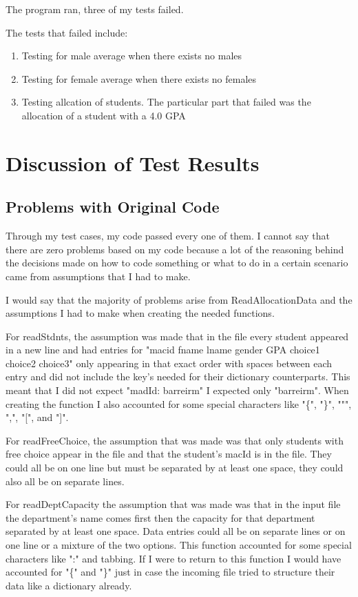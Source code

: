 \documentclass[12pt]{article}
\begin{document}
The program ran, three of my tests failed. 

The tests that failed include: 
\begin{enumerate}

\item Testing for male average when there exists no males
\item Testing for female average when there exists no females
\item Testing allcation of students. The particular part that failed was the allocation of a student with a 4.0 GPA 

\end{enumerate}

\section{Discussion of Test Results}

\subsection{Problems with Original Code}

Through my test cases, my code passed every one of them. I cannot say that there are zero problems based on my code because a lot of the 
reasoning behind the decisions made on how to code something or what to do in a certain scenario came from assumptions that I had to make.

I would say that the majority of problems arise from ReadAllocationData and the assumptions I had to make when creating the needed
functions. 

For readStdnts, the assumption was made that in the file every student appeared in a new line and had entries for "macid 
fname lname gender GPA choice1 choice2 choice3" only appearing in that exact order with spaces between each entry and did not include the
key's needed for their dictionary counterparts. This meant that I did not expect "madId: barreirm" I expected only "barreirm". When 
creating the function I also accounted for some special characters like "\{", "\}", """, ",", "[", and "]". 

For readFreeChoice, the assumption that was made was that only students with free choice appear in the file and that the student's macId is
in the file. They could all be on one line but must be separated by at least one space, they could also all be on separate lines. 

For readDeptCapacity the assumption that was made was that in the input file the department's name comes first then the capacity for that
department separated by at least one space. Data entries could all be on separate lines or on one line or a mixture of the two options. 
This function accounted for some special characters like ":" and tabbing. If I were to return to this function I would have accounted for 
"\{" and "\}" just in case the incoming file tried to structure their data like a dictionary already.
\end{document}
